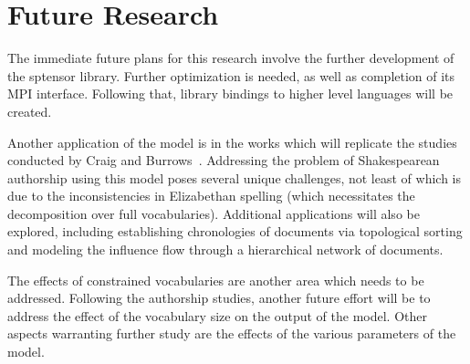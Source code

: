 \documentclass[../ut-dissertation.tex]{subfiles}
\begin{document}
\section{Future Research}
The immediate future plans for this research involve the further
development of the sptensor library.  Further optimization is needed,
as well as completion of its MPI interface.  Following that, library
bindings to higher level languages will be created.

Another application of the model is in the works which will replicate
the studies conducted by Craig and Burrows~\cite{burrows2017,
  craig2009}.  Addressing the problem of Shakespearean authorship
using this model poses several unique challenges, not least of which
is due to the inconsistencies in Elizabethan spelling (which
necessitates the decomposition over full vocabularies).  Additional
applications will also be explored, including establishing
chronologies of documents via topological sorting and modeling the
influence flow through a hierarchical network of documents.

The effects of constrained vocabularies are another area which needs
to be addressed.  Following the authorship studies, another future
effort will be to address the effect of the vocabulary size on the
output of the model.  Other aspects warranting further study are the
effects of the various parameters of the model.  
\end{document}
